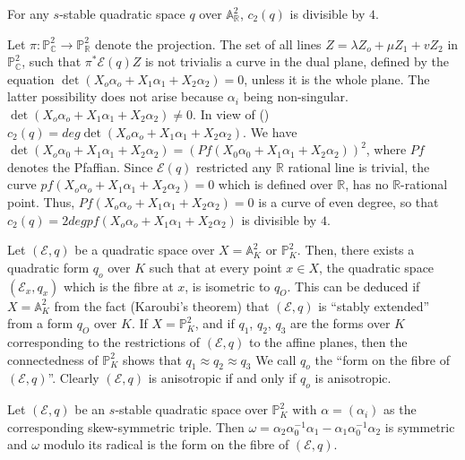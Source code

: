 \begin{Prop}\label{Prop2.4}
For any $s$-stable quadratic space $q$ over $\mathbb{A}^{2}_{\mathbb{R}}$, $c_2(q)$ is divisible by $4$. 
\end{Prop}

\begin{Proof}
Let $\pi:\mathbb{P}^{2}_{\mathbb{C}}\to \mathbb{P}^{2}_{\mathbb{R}}$ denote the projection. The set of all lines $Z=\lambda Z_o+\mu Z_1+vZ_2$ in $\mathbb{P}^{2}_{\mathbb{C}}$, such that $\pi^{\ast}\mathscr{E}(q)Z$ is not trivial\pageoriginale is a curve in the dual plane, defined by the equation $\det (X_o\alpha_o+X_1\alpha_1+X_2\alpha_2)=0$, unless it is the whole plane. The latter possibility does not arise because $\alpha_i$ being non-singular. $\det (X_o\alpha_o+X_1\alpha_1+X_2\alpha_2)\neq 0$. In view of (\cite[\S\ 1.7.1]{key4}) $c_2(q)=deg \det(X_o\alpha_o+X_1\alpha_1+X_2\alpha_2)$. We have $\det(X_o\alpha_0+X_1\alpha_1+X_2\alpha_2)=(Pf(X_0\alpha_0+X_1\alpha_1+X_2\alpha_2))^{2}$, where $Pf$ denotes the Pfaffian. Since $\mathscr{E}(q)$ restricted any $\mathbb{R}$ rational line is trivial, the curve $pf(X_o\alpha_o+X_1\alpha_1+X_2\alpha_2)=0$ which is defined over $\mathbb{R}$, has no $\mathbb{R}$-rational point. Thus, $Pf(X_o\alpha_o+X_1\alpha_1+X_2\alpha_2)=0$ is a curve of even degree, so that $c_2(q)=2deg pf(X_o\alpha_o+X_1\alpha_1+X_2\alpha_2)$ is divisible by $4$. 

Let $(\mathscr{E},q)$ be a quadratic space over $X=\mathbb{A}^{2}_K$ or $\mathbb{P}^{2}_K$. Then, there exists a quadratic form $q_o$ over $K$ such that at every point $x\in X$, the quadratic space $(\mathscr{E}_x,q_x)$ which is the fibre at $x$, is isometric to $q_O$. This can be deduced if $X=\mathbb{A}^{2}_K$ from the fact (Karoubi's theorem) that $(\mathscr{E},q)$ is ``stably extended'' from a form $q_O$ over $K$. If $X=\mathbb{P}^{2}_K$, and if $q_1$, $q_2$, $q_3$ are the forms over $K$  corresponding to the restrictions of $(\mathscr{E},q)$ to the affine planes, then the connectedness of $\mathbb{P}^{2}_K$ shows that $q_1\approx q_2\approx q_3$ We call $q_o$ the ``form on the fibre of $(\mathscr{E},q)$''. Clearly $(\mathscr{E},q)$ is anisotropic if and only if $q_o$ is anisotropic. 
\end{Proof}

\begin{Prop}\label{Prop2.5}
Let $(\mathscr{E},q)$ be an $s$-stable quadratic space over $\mathbb{P}^{2}_K$ with $\alpha=(\alpha_i)$ as the corresponding skew-symmetric triple. Then $\omega=\alpha_2\alpha_0^{-1}\alpha_1-\alpha_1\alpha_0^{-1}\alpha_2$ is symmetric and $\omega$ modulo its radical is the form on the fibre of $(\mathscr{E}, q)$. 
\end{Prop}

